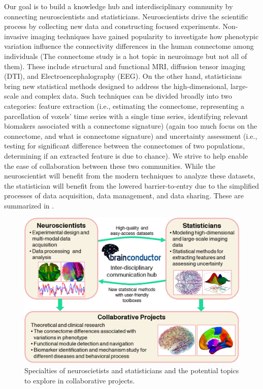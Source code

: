 \documentclass{nature}
\begin{document}
Our goal is to %
build a knowledge hub and interdisciplinary community by connecting
neuroscientists and statisticians.  Neuroscientists
drive the scientific process by collecting new data and constructing focused
experiments. Non-invasive imaging techniques have gained popularity to
investigate how phenotypic variation
influence the connectivity differences in the human
connectome among individuals\cite{sporns2005human,sporns2011human} 
{\color{red}(The connectome study is a hot topic in neuroimage but not all of them)}. 
These include structural and functional MRI,
diffusion tensor imaging (DTI), and Electroencephalography
(EEG).
On the other hand, statisticians bring new statistical methods
designed to address the high-dimensional, large-scale and complex
data. Such techniques can be divided broadly into
two categories:
feature extraction (i.e., estimating the connectome, representing
a parcellation of voxels' time series with a single time series,
identifying relevant biomakers associated with a connectome signature)
{\color{red}(again too much focus on the connectome, and what is connectome signature)}
and uncertainty assessment (i.e., testing for significant difference
between the connectomes of two populations, determining if 
an extracted feature is due to chance).
We strive to help enable the ease of collaboration between these two communities.
While the neuroscientist will benefit from the modern techniques to
analyze these datasets, the statistician
will benefit from the lowered barrier-to-entry
due to the  simplified processes of data acquisition, data management, and data
sharing. These are summarized in .

\begin{figure}[tb]
\centering
\includegraphics[width=400pt]{fig/brainconductor/Brainconductor_overview.png}
\caption{Specialties of neuroscietists and statisticians and the potential
topics to explore in collaborative projects.}
\label{fig:overview}
\end{figure}
\end{document}
